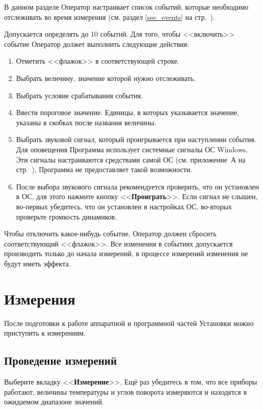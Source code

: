 \documentclass[12pt, a4paper, twocolumn]{book}
\newcommand{\CTL}[1]{<<{\bf #1}>>}
\begin{document}
В данном разделе Оператор настраивает список событий, которые необходимо отслеживать во время измерения (см. раздел \ref{sec_events} на стр.~\pageref{sec_events}).

Допускается определять до 10 событий. Для того, чтобы <<включить>> событие Оператор должет выполнить следующие действия:

\begin{enumerate}
\item Отметить <<флажок>> в соответствующей строке.
\item Выбрать величину, значение которой нужно отслеживать.
\item Выбрать условие срабатывания события.
\item Ввести пороговое значение. Единицы, в которых указывается значение, указаны в скобках после названия величины.
\item Выбрать звуковой сигнал, который проигрывается при наступлении события. Для оповещения Программа использует системные сигналы ОС Windows. Эти сигналы настраиваются средствами самой ОС (см. приложение~А на стр.~\pageref{sec_system_sounds}), Программа не предоставляет такой возможности.
\item После выбора звукового сигнала рекомендуется проверить, что он установлен в ОС, для этого нажмите кнопку \CTL{Проиграть}. Если сигнал не слышен, во-первых убедитесь, что он установлен в настройках ОС, во-вторых проверьте громкость динамиков.
\end{enumerate}

Чтобы отключить какое-нибудь событие, Оператор должен сбросить соответствующий <<флажок>>. Все изменения в событиях допускается производить только до начала измерений, в процессе измерений изменения не будут иметь эффекта.

\chapter{Измерения}

После подготовки к работе аппаратной и программной частей Установки можно приступить к измерениям.

\section{Проведение измерений}

Выберите вкладку \CTL{Измерение}. Ещё раз убедитесь в том, что все приборы работают, величины температуры и углов поворота  измеряются и находятся в ожидаемом диапазоне значений.
\end{document}
